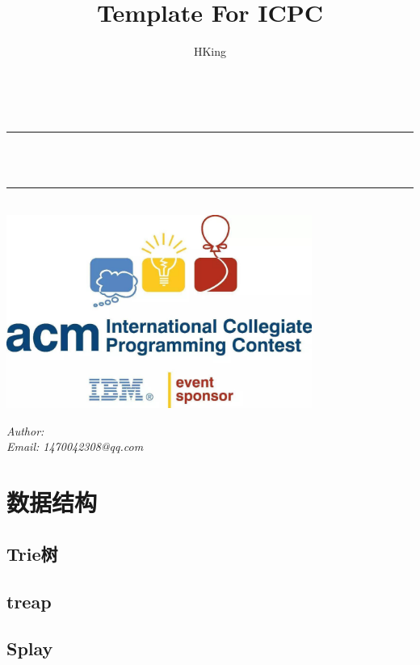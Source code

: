 \documentclass[10pt,a4paper]{article}
\title{Template For ICPC}
\author{HKing}
\begin{document}
\begin{titlepage}
	\newcommand{\HRule}{\rule{\linewidth}{0.1mm}}
	\center 
	\quad\\[1.5cm]
	\makeatletter
	\HRule \\[0.4cm]
	\emph{\fontsize{40pt}{\baselineskip}\selectfont \bfseries \@title}\\[0.2cm] 
	\HRule \\[5cm]
    \includegraphics[width=10cm]{logo.jpeg}\\[1cm] 
    \vskip 5cm
    \begin{minipage}{1\textwidth}
		\begin{center} \LARGE
			\emph{Author: \@author} \\
            \emph{Email: 1470042308@qq.com} \\
		\end{center}
	\end{minipage}
	\makeatother
	\vfill
\thispagestyle{empty}
\pagebreak
\pagestyle{plain}
\tableofcontents
\end{titlepage}\section{数据结构}
\subsection{Trie树}

\subsection{treap}

\subsection{Splay}

\end{document}
